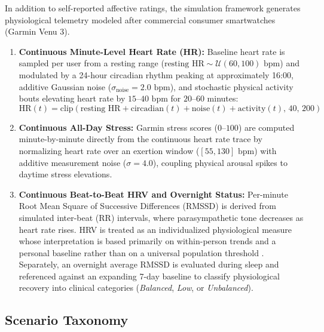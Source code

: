 \documentclass[11pt,letterpaper]{article}
\begin{document}
In addition to self-reported affective ratings, the simulation framework generates physiological telemetry modeled after commercial consumer smartwatches (Garmin Venu 3).

\begin{enumerate}
    \item \textbf{Continuous Minute-Level Heart Rate (HR):} Baseline heart rate is sampled per user from a resting range ($\text{resting HR} \sim \mathcal{U}(60, 100)\text{ bpm}$) and modulated by a 24-hour circadian rhythm peaking at approximately 16:00, additive Gaussian noise ($\sigma_{\text{noise}} = 2.0\text{ bpm}$), and stochastic physical activity bouts elevating heart rate by $15$--$40\text{ bpm}$ for $20$--$60$ minutes:
    \begin{equation}
    \text{HR}(t) = \text{clip}\left(\text{resting HR} + \text{circadian}(t) + \text{noise}(t) + \text{activity}(t),\, 40,\, 200\right)
    \end{equation}
    
    \item \textbf{Continuous All-Day Stress:} Garmin stress scores ($0$--$100$) are computed minute-by-minute directly from the continuous heart rate trace by normalizing heart rate over an exertion window ($[55, 130]\text{ bpm}$) with additive measurement noise ($\sigma = 4.0$), coupling physical arousal spikes to daytime stress elevations.
    
    \item \textbf{Continuous Beat-to-Beat HRV and Overnight Status:} Per-minute Root Mean Square of Successive Differences (RMSSD) is derived from simulated inter-beat (RR) intervals, where parasympathetic tone decreases as heart rate rises. HRV is treated as an individualized physiological measure whose interpretation is based primarily on within-person trends and a personal baseline rather than on a universal population threshold \cite{oura_average_hrv}. Separately, an overnight average RMSSD is evaluated during sleep and referenced against an expanding 7-day baseline to classify physiological recovery into clinical categories (\textit{Balanced}, \textit{Low}, or \textit{Unbalanced}).
\end{enumerate}

\subsection{Scenario Taxonomy}
\end{document}

